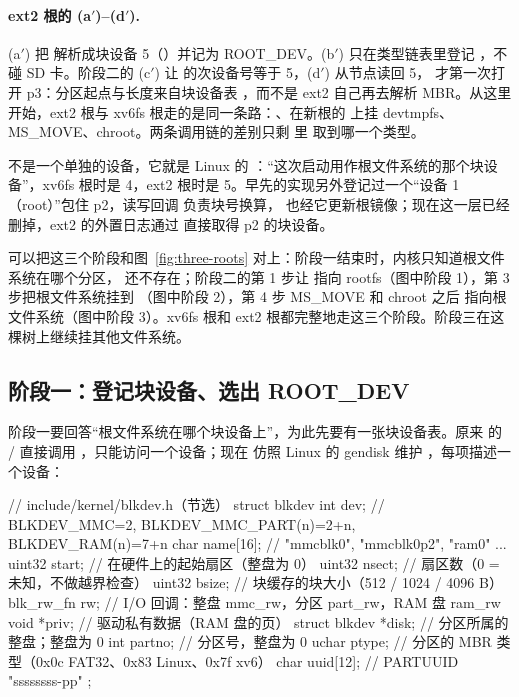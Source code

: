 \paragraph{ext2 根的 (a$'$)--(d$'$).} (a$'$) 把  解析成块设备 5（）并记为 ROOT\_DEV。(b$'$)  只在类型链表里登记 ，不碰 SD 卡。阶段二的 (c$'$) 让  的次设备号等于 5，(d$'$)  从节点读回 5， 才第一次打开 p3：分区起点与长度来自块设备表 ，而不是 ext2 自己再去解析 MBR。从这里开始，ext2 根与 xv6fs 根走的是同一条路：、在新根的  上挂 devtmpfs、MS\_MOVE、chroot。两条调用链的差别只剩  里  取到哪一个类型。

 不是一个单独的设备，它就是 Linux 的 ：“这次启动用作根文件系统的那个块设备”，xv6fs 根时是 4，ext2 根时是 5。早先的实现另外登记过一个“设备 1（root）”包住 p2，读写回调  负责块号换算， 也经它更新根镜像；现在这一层已经删掉，ext2 的外置日志通过  直接取得 p2 的块设备。

可以把这三个阶段和图~\ref{fig:three-roots} 对上：阶段一结束时，内核只知道根文件系统在哪个分区，\code{/} 还不存在；阶段二的第 1 步让 \code{/} 指向 rootfs（图中阶段 1），第 3 步把根文件系统挂到 （图中阶段 2），第 4 步 MS\_MOVE 和 chroot 之后 \code{/} 指向根文件系统（图中阶段 3）。xv6fs 根和 ext2 根都完整地走这三个阶段。阶段三在这棵树上继续挂其他文件系统。

\subsection{阶段一：登记块设备、选出 ROOT\_DEV}
\label{sec:ns-stage1}

阶段一要回答“根文件系统在哪个块设备上”，为此先要有一张块设备表。原来  的 / 直接调用 ，只能访问一个设备；现在  仿照 Linux 的 gendisk 维护 ，每项描述一个设备：

\begin{ccode}
// include/kernel/blkdev.h（节选）
struct blkdev {
  int      dev;      // BLKDEV_MMC=2, BLKDEV_MMC_PART(n)=2+n, BLKDEV_RAM(n)=7+n
  char     name[16]; // "mmcblk0", "mmcblk0p2", "ram0" ...
  uint32   start;    // 在硬件上的起始扇区（整盘为 0）
  uint32   nsect;    // 扇区数（0 = 未知，不做越界检查）
  uint32   bsize;    // 块缓存的块大小（512 / 1024 / 4096 B）
  blk_rw_fn rw;      // I/O 回调：整盘 mmc_rw，分区 part_rw，RAM 盘 ram_rw
  void     *priv;    // 驱动私有数据（RAM 盘的页）
  struct blkdev *disk;   // 分区所属的整盘；整盘为 0
  int      partno;   // 分区号，整盘为 0
  uchar    ptype;    // 分区的 MBR 类型（0x0c FAT32、0x83 Linux、0x7f xv6）
  char     uuid[12]; // PARTUUID "ssssssss-pp"
};
\end{ccode}

